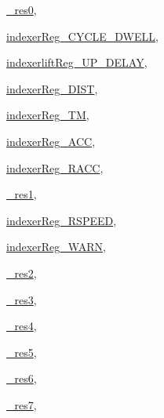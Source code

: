 \begin{DoxyCompactItemize}
\begin{DoxyCompactItemize}
\item\mbox{\hyperlink{classRegister_ad406f9442f13b42de4753bae5c705733a985279770ef2cfa65b09d8494c035519}{\+\_\+res0}}, 
\item\mbox{\hyperlink{classRegister_ad406f9442f13b42de4753bae5c705733a2afdeb201f85f50ec7d5cb5b91d77f76}{indexer\+Reg\+\_\+\+C\+Y\+C\+L\+E\+\_\+\+D\+W\+E\+LL}}, 
\item\mbox{\hyperlink{classRegister_ad406f9442f13b42de4753bae5c705733a91acb51c5932b70fa10d1a067c082ba7}{indexerlift\+Reg\+\_\+\+U\+P\+\_\+\+D\+E\+L\+AY}}, 
\item\mbox{\hyperlink{classRegister_ad406f9442f13b42de4753bae5c705733a5b502e6a988e2cb8df21f10c472c6ba8}{indexer\+Reg\+\_\+\+D\+I\+ST}}, 
\item\mbox{\hyperlink{classRegister_ad406f9442f13b42de4753bae5c705733a669b7ffa4981bb80492e131a38152f6f}{indexer\+Reg\+\_\+\+TM}}, 
\item\mbox{\hyperlink{classRegister_ad406f9442f13b42de4753bae5c705733a1cc97d3565727e2be7c4782675a94c52}{indexer\+Reg\+\_\+\+A\+CC}}, 
\item\mbox{\hyperlink{classRegister_ad406f9442f13b42de4753bae5c705733ae4d9ec8df7f7043f6629e40cede35866}{indexer\+Reg\+\_\+\+R\+A\+CC}}, 
\item\mbox{\hyperlink{classRegister_ad406f9442f13b42de4753bae5c705733ab2ae9511e6a4a49726e1bd7617a0f909}{\+\_\+res1}}, 
\item\mbox{\hyperlink{classRegister_ad406f9442f13b42de4753bae5c705733a593fab6b868adfb75c729a4b5b8643e7}{indexer\+Reg\+\_\+\+R\+S\+P\+E\+ED}}, 
\item\mbox{\hyperlink{classRegister_ad406f9442f13b42de4753bae5c705733a8d1e13758d14948fb00a093d21fa99fe}{indexer\+Reg\+\_\+\+W\+A\+RN}}, 
\item\mbox{\hyperlink{classRegister_ad406f9442f13b42de4753bae5c705733a0f473c22415c6c9daf92839e7fbb86ed}{\+\_\+res2}}, 
\item\mbox{\hyperlink{classRegister_ad406f9442f13b42de4753bae5c705733a245f15c4e10450fe3db51504a663c5a2}{\+\_\+res3}}, 
\item\mbox{\hyperlink{classRegister_ad406f9442f13b42de4753bae5c705733a02b986c6b59112993247fad84a1589c0}{\+\_\+res4}}, 
\item\mbox{\hyperlink{classRegister_ad406f9442f13b42de4753bae5c705733a02c3c3a6af0f1635be02092b5c41c1b0}{\+\_\+res5}}, 
\item\mbox{\hyperlink{classRegister_ad406f9442f13b42de4753bae5c705733a0cf0ef6ae7cd0c6c8585023da46b240f}{\+\_\+res6}}, 
\item\mbox{\hyperlink{classRegister_ad406f9442f13b42de4753bae5c705733adc8edf1fc1ffcd90807a28a8238a52db}{\+\_\+res7}}, 

\end{DoxyCompactItemize}
\end{DoxyCompactItemize}
